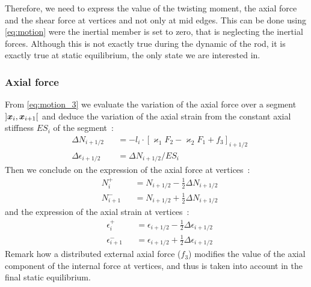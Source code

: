 Therefore, we need to express the value of the twisting moment, the axial force and the shear force at vertices and not only at mid edges. This can be done using \cref{eq:motion} were the inertial member is set to zero, that is neglecting the inertial forces. Although this is not exactly true during the dynamic of the rod, it is exactly true at static equilibrium, the only state we are interested in.

\subsubsection{Axial force}
From \cref{eq:motion_3} we evaluate the variation of the axial force over a segment $]\boldsymbol{x}_{i},  \boldsymbol{x}_{i+1}[$ and deduce the variation of the axial strain from the constant axial stiffness $ES_i$ of the segment~: 
\begin{subequations}
	\begin{alignat}{2}
		&\Delta N_{i+1/2} &&= -l_i  \cdot {[\varkappa_1 F_2 - \varkappa_2 F_1 + f_3]}_{i+1/2}
		\label{eq:DeltaN}
		\\
		&\Delta \epsilon_{i+1/2} &&= \Delta N_{i+1/2} / {ES}_i
	\end{alignat}
\end{subequations}
Then we conclude on the expression of the axial force at vertices~:
\begin{subequations}
	\begin{alignat}{2}
		&N_{i}^{+} &&= N_{i+1/2} - \frac{1}{2} \Delta N_{i+1/2}  \\[0.5em]
		&N_{i+1}^{-} &&= N_{i+1/2} + \frac{1}{2} \Delta N_{i+1/2}
	\end{alignat}
	\label{eq:dNi}
\end{subequations}
and the expression of the axial strain at vertices~:
\begin{subequations}
	\begin{alignat}{2}
		&\epsilon_{i}^{+} &&= \epsilon_{i+1/2} - \frac{1}{2} \Delta \epsilon_{i+1/2}  \\[0.5em]
		&\epsilon_{i+1}^{-} &&= \epsilon_{i+1/2} + \frac{1}{2} \Delta \epsilon_{i+1/2}
	\end{alignat}
\end{subequations}
Remark how a distributed external axial force (${f}_3$) modifies the value of the axial component of the internal force at vertices, and thus is taken into account in the final static equilibrium.

